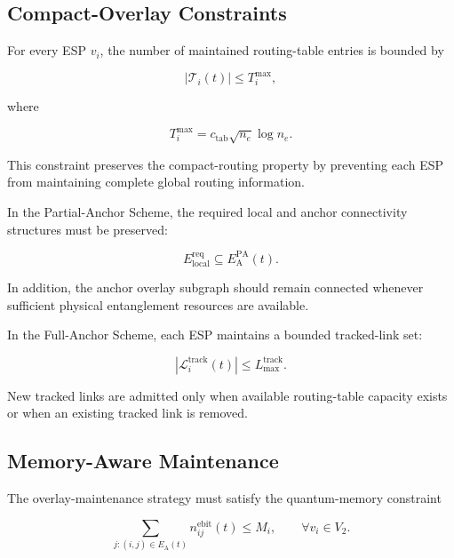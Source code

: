 \subsection{Compact-Overlay Constraints}

For every ESP $v_i$, the number of maintained routing-table entries is bounded by

\begin{equation}
    |\mathcal{T}_i(t)|
    \leq
    T_i^{\max},
\end{equation}

where

\begin{equation}
    T_i^{\max}
    =
    c_{\mathrm{tab}}
    \sqrt{n_e}
    \log n_e .
\end{equation}

This constraint preserves the compact-routing property by preventing each ESP from maintaining complete global routing information.

In the Partial-Anchor Scheme, the required local and anchor connectivity structures must be preserved:

\begin{equation}
    E_{\mathrm{local}}^{\mathrm{req}}
    \subseteq
    E_{\mathrm{A}}^{\mathrm{PA}}(t).
\end{equation}

In addition, the anchor overlay subgraph should remain connected whenever sufficient physical entanglement resources are available.

In the Full-Anchor Scheme, each ESP maintains a bounded tracked-link set:

\begin{equation}
    \left|
    \mathcal{L}_{i}^{\mathrm{track}}(t)
    \right|
    \leq
    L_{\max}^{\mathrm{track}}.
\end{equation}

New tracked links are admitted only when available routing-table capacity exists or when an existing tracked link is removed.


\subsection{Memory-Aware Maintenance}

The overlay-maintenance strategy must satisfy the quantum-memory constraint

\begin{equation}
    \sum_{
    j:
    (i,j)
    \in
    E_{\mathrm{A}}(t)
    }
    n_{ij}^{\mathrm{ebit}}(t)
    \leq
    M_i,
    \qquad
    \forall v_i
    \in
    V_2 .
\end{equation}

